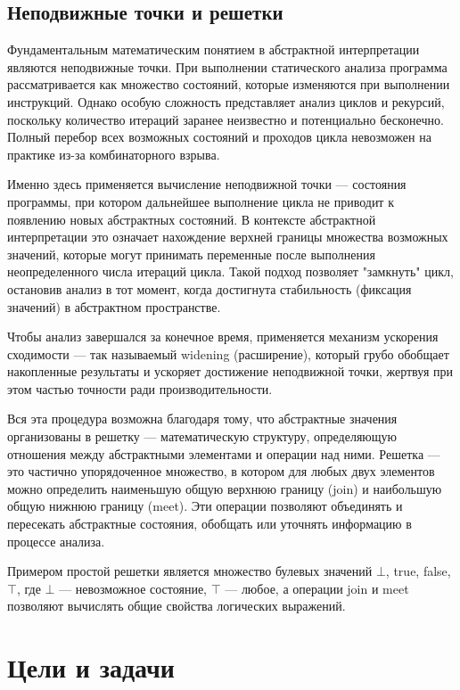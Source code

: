 \subsection{Неподвижные точки и решетки}

Фундаментальным математическим понятием в абстрактной интерпретации являются неподвижные точки. При выполнении статического анализа программа рассматривается как множество состояний, которые изменяются при выполнении инструкций. Однако особую сложность представляет анализ циклов и рекурсий, поскольку количество итераций заранее неизвестно и потенциально бесконечно. Полный перебор всех возможных состояний и проходов цикла невозможен на практике из-за комбинаторного взрыва.

Именно здесь применяется вычисление неподвижной точки — состояния программы, при котором дальнейшее выполнение цикла не приводит к появлению новых абстрактных состояний. В контексте абстрактной интерпретации это означает нахождение верхней границы множества возможных значений, которые могут принимать переменные после выполнения неопределенного числа итераций цикла. Такой подход позволяет "замкнуть" цикл, остановив анализ в тот момент, когда достигнута стабильность (фиксация значений) в абстрактном пространстве.

Чтобы анализ завершался за конечное время, применяется механизм ускорения сходимости — так называемый widening (расширение), который грубо обобщает накопленные результаты и ускоряет достижение неподвижной точки, жертвуя при этом частью точности ради производительности.

Вся эта процедура возможна благодаря тому, что абстрактные значения организованы в решетку — математическую структуру, определяющую отношения между абстрактными элементами и операции над ними. Решетка — это частично упорядоченное множество, в котором для любых двух элементов можно определить наименьшую общую верхнюю границу (join) и наибольшую общую нижнюю границу (meet). Эти операции позволяют объединять и пересекать абстрактные состояния, обобщать или уточнять информацию в процессе анализа.

Примером простой решетки является множество булевых значений {$\bot$, true, false, $\top$}, где $\bot$ — невозможное состояние, $\top$ — любое, а операции join и meet позволяют вычислять общие свойства логических выражений.

\newpage
\section{Цели и задачи}

